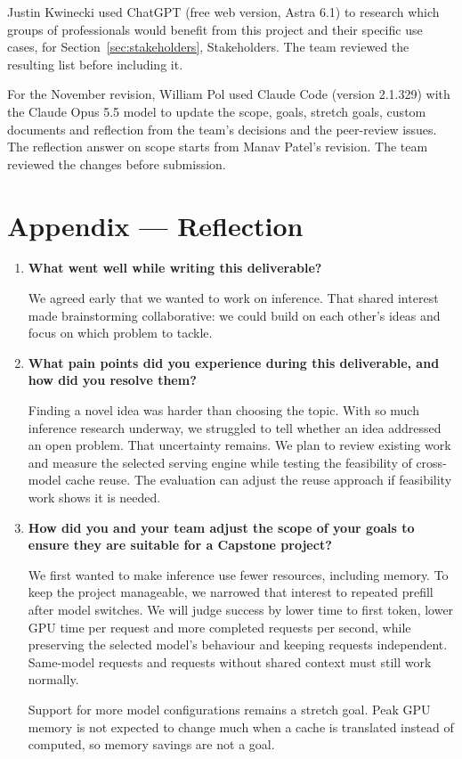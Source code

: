 \documentclass[11pt]{article}
\begin{document}
Justin Kwinecki used ChatGPT (free web version, Astra 6.1) to research which groups
of professionals would benefit from this project and their specific use
cases, for Section~\ref{sec:stakeholders}, Stakeholders. The team reviewed
the resulting list before including it.

For the November revision, William Pol used Claude Code (version 2.1.329)
with the Claude Opus 5.5 model to update the scope, goals, stretch goals,
custom documents and reflection from the team's decisions and the
peer-review issues. The reflection answer on scope starts from Manav
Patel's revision. The team reviewed the changes before submission.

\section*{Appendix --- Reflection}

\begin{enumerate}
  \item \textbf{What went well while writing this deliverable?}

  We agreed early that we wanted to work on inference. That shared
  interest made brainstorming collaborative: we could build on each
  other's ideas and focus on which problem to tackle.

  \item \textbf{What pain points did you experience during this
  deliverable, and how did you resolve them?}

  Finding a novel idea was harder than choosing the topic. With so much
  inference research underway, we struggled to tell whether an idea
  addressed an open problem. That uncertainty remains. We plan to review
  existing work and measure the selected serving engine while testing the
  feasibility of cross-model cache reuse. The evaluation can adjust the
  reuse approach if feasibility work shows it is needed.

  \item \textbf{How did you and your team adjust the scope of your goals
  to ensure they are suitable for a Capstone project?}

  We first wanted to make inference use fewer resources, including memory.
  To keep the project manageable, we narrowed that interest to repeated
  prefill after model switches. We will judge success by lower time to
  first token, lower GPU time per request and more completed requests per
  second, while preserving the selected model's behaviour and keeping
  requests independent. Same-model requests and requests without shared
  context must still work normally.

  Support for more model configurations remains a stretch goal. Peak GPU
  memory is not expected to change much when a cache is translated instead
  of computed, so memory savings are not a goal.
\end{enumerate}
\end{document}
